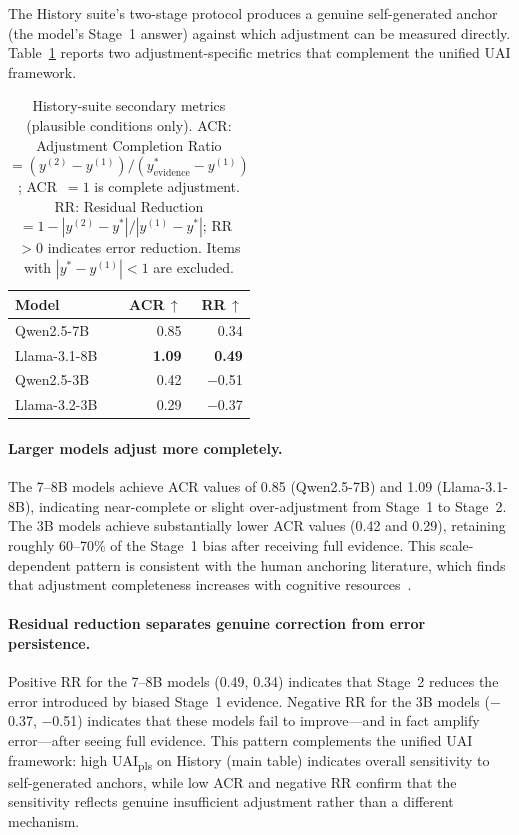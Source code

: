 The History suite's two-stage protocol produces a genuine
self-generated anchor (the model's Stage~1 answer) against
which adjustment can be measured directly.
Table~\ref{tab:history_secondary} reports two
adjustment-specific metrics that complement the unified
UAI framework.

\begin{table}[h]
\centering
\small
\begin{tabular}{@{}lrr@{}}
\toprule
\textbf{Model}
  & \textbf{ACR}$\,\uparrow$
  & \textbf{RR}$\,\uparrow$ \\
\midrule
Qwen2.5-7B    & 0.85  & 0.34 \\
Llama-3.1-8B  & \textbf{1.09}  & \textbf{0.49} \\
Qwen2.5-3B    & 0.42  & $-$0.51 \\
Llama-3.2-3B  & 0.29  & $-$0.37 \\
\bottomrule
\end{tabular}
\caption{History-suite secondary metrics (plausible conditions
  only).
  ACR: Adjustment Completion Ratio
  $= (y^{(2)} - y^{(1)}) / (y^{*}_{\text{evidence}} - y^{(1)})$;
  ACR~$= 1$ is complete adjustment.
  RR: Residual Reduction
  $= 1 - |y^{(2)} - y^{*}| / |y^{(1)} - y^{*}|$;
  RR~$> 0$ indicates error reduction.
  Items with $|y^{*} - y^{(1)}| < 1$ are excluded.}
\label{tab:history_secondary}
\end{table}

\paragraph{Larger models adjust more completely.}
The 7--8B models achieve ACR values of 0.85 (Qwen2.5-7B) and
1.09 (Llama-3.1-8B), indicating near-complete or slight
over-adjustment from Stage~1 to Stage~2.
The 3B models achieve substantially lower ACR values (0.42 and
0.29), retaining roughly 60--70\% of the Stage~1 bias after
receiving full evidence.
This scale-dependent pattern is consistent with the human
anchoring literature, which finds that adjustment completeness
increases with cognitive resources~\citep{epley2001putting}.

\paragraph{Residual reduction separates genuine correction
  from error persistence.}
Positive RR for the 7--8B models (0.49, 0.34) indicates that
Stage~2 reduces the error introduced by biased Stage~1
evidence.
Negative RR for the 3B models ($-$0.37, $-$0.51) indicates
that these models fail to improve---and in fact amplify
error---after seeing full evidence.
This pattern complements the unified UAI framework:
high UAI\textsubscript{pls} on History (main table) indicates
overall sensitivity to self-generated anchors, while low ACR
and negative RR confirm that the sensitivity reflects genuine
insufficient adjustment rather than a different mechanism.
